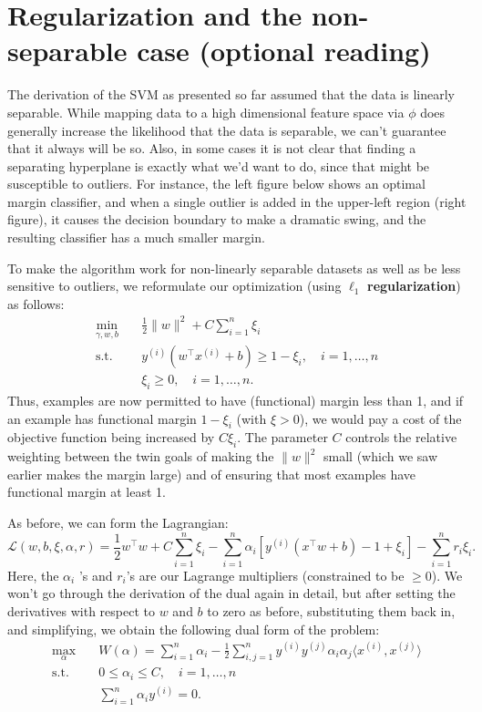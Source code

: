 \section{Regularization and the non-separable case (optional reading)}
The derivation of the SVM as presented so far assumed that the data is
linearly separable. While mapping data to a high dimensional feature space
via $\phi$ does generally increase the likelihood that the data is separable, we
can't guarantee that it always will be so. Also, in some cases it is not clear
that finding a separating hyperplane is exactly what we'd want to do, since
that might be susceptible to outliers. For instance, the left figure below
shows an optimal margin classifier, and when a single outlier is added in the
upper-left region (right figure), it causes the decision boundary to make a
dramatic swing, and the resulting classifier has a much smaller margin.

To make the algorithm work for non-linearly separable datasets as well
as be less sensitive to outliers, we reformulate our optimization (using $\ell_1$
\textbf{regularization}) as follows:
\begin{align*}
    \min_{\gamma,w,b} \quad& \frac{1}{2} \lVert w \rVert^2 + C \sum_{i=1}^n \xi_i\\
    \operatorname{s.t.} \quad& y^{(i)} (w^\top x^{(i)} + b) \ge 1 - \xi_i ,\quad i = 1,\ldots ,n\\
    \quad& \xi_i \ge 0,\quad i = 1,\ldots ,n.
\end{align*}
Thus, examples are now permitted to have (functional) margin less than 1,
and if an example has functional margin $1 - \xi_i$ (with $\xi > 0$), we would pay
a cost of the objective function being increased by $C\xi_i$. The parameter $C$
controls the relative weighting between the twin goals of making the $\lVert w \rVert^2$
small (which we saw earlier makes the margin large) and of ensuring that
most examples have functional margin at least 1.

As before, we can form the Lagrangian:
\begin{equation*}
    \mathcal L(w,b,\xi,\alpha,r) = \frac{1}{2} w^\top w + C \sum_{i=1}^n \xi_i - \sum_{i=1}^n \alpha_i \left[ y^{(i)} (x^\top w + b) - 1 + \xi_i \right] - \sum_{i=1}^n r_i \xi_i.    
\end{equation*}
Here, the $\alpha_i$ 's and $r_i$'s are our Lagrange multipliers (constrained to be $\ge 0$).
We won't go through the derivation of the dual again in detail, but after
setting the derivatives with respect to $w$ and $b$ to zero as before, substituting
them back in, and simplifying, we obtain the following dual form of the
problem:{}
\begin{align*}
    \max_\alpha \quad& W(\alpha) = \sum_{i=1}^n \alpha_i - \frac{1}{2} \sum_{i,j=1}^n y^{(i)} y^{(j)} \alpha_i \alpha_j \langle x^{(i)} ,x^{(j)} \rangle\\
    \operatorname{s.t.} \quad& 0 \le \alpha_i \le C,\quad i = 1,\ldots ,n\\
    \quad& \sum_{i=1}^n \alpha_i y^{(i)} = 0. %
\end{align*}

